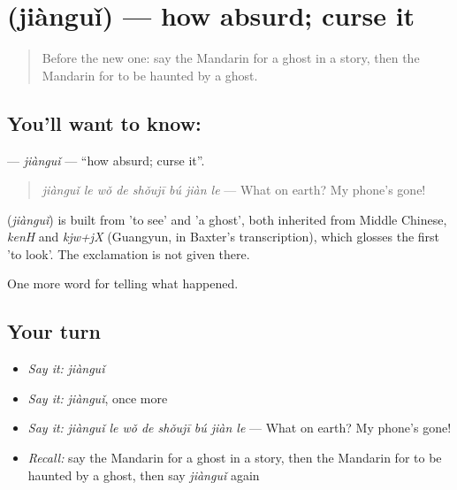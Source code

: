 \section[\texorpdfstring{\zh{见鬼} (jiànguǐ)}{见鬼 (jiànguǐ)}]{ (jiànguǐ) — how absurd; curse it}

\label{lesson:ZH-C332-jiangui}



\begin{quote}
Before the new one: say the Mandarin for a ghost in a story, then the Mandarin for to be haunted by a ghost.
\end{quote}

\subsection*{You'll want to know: }
\textbf{} — \emph{jiànguǐ} — \textquotedblleft{}how absurd; curse it\textquotedblright{}.

\begin{quote}
\textbf{} \emph{jiànguǐ le wǒ de shǒujī bú jiàn le} — What on earth? My phone's gone!
\end{quote}

\begin{cousinweb}
\textbf{} (\emph{jiànguǐ}) is built from  'to see' and  'a ghost', both inherited from Middle Chinese, \emph{kenH} and \emph{kjw+jX} (Guangyun, in Baxter's transcription), which glosses the first 'to look'. The exclamation is not given there.
\end{cousinweb}

\begin{grammarlens}[title={What you've built}]
One more word for telling what happened.
\end{grammarlens}

\subsection*{Your turn}
\begin{itemize}
\raggedright
  \item \emph{Say it:} \emph{jiànguǐ}
  \item \emph{Say it:} \emph{jiànguǐ}, once more
  \item \emph{Say it:} \emph{jiànguǐ le wǒ de shǒujī bú jiàn le} — What on earth? My phone's gone!
  \item \emph{Recall:} say the Mandarin for a ghost in a story, then the Mandarin for to be haunted by a ghost, then say \emph{jiànguǐ} again
\end{itemize}


